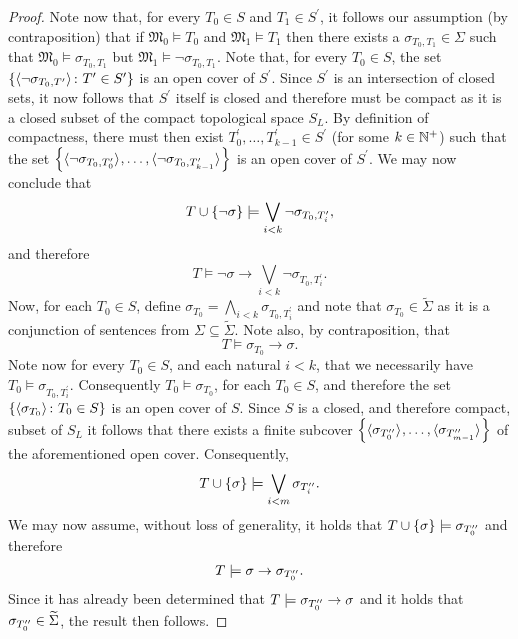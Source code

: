 \begin{proof}
	Note now that, for every $T_0\in S$ and $T_1\in S^\prime$, it follows our assumption (by contraposition) that if $\mathfrak{M}_0\models T_0$ and $\mathfrak{M}_1\models T_1$ then there exists a $\sigma_{T_0,T_1}\in\Sigma$ such that $\mathfrak{M}_0\models\sigma_{T_0,T_1}$ but $\mathfrak{M}_1\models\neg\sigma_{T_0,T_1}$.  Note that, for every $T_0\in S$, the set $\left\lbrace \langle \neg\sigma_{T_0,T^\prime}\rangle_{}\colon {T^\prime\in S^\prime} \right\rbrace$ is an open cover of $S^\prime$.  Since $S^\prime$ is an intersection of closed sets, it now follows that $S^\prime$ itself is closed and therefore must be compact as it is a closed subset of the compact topological space $S_L$.  By definition of compactness, there must then exist $T^\prime_0,\dotsc,T^\prime_{k-1}\in S^\prime$ (for some $k\in\mathbb{N}^{+}$) such that the set $\left\lbrace \langle \neg\sigma_{T_0,T^\prime_0}\rangle_{},\dotsc,\langle \neg\sigma_{T_0,T^\prime_{k-1}}\rangle_{}\right\rbrace$ is an open cover of $S^\prime$.  We may now conclude that
	\begin{equation}
		T\cup\left\lbrace \neg\sigma\right\rbrace\models\bigvee_{i<k}\neg\sigma_{T_0,T^\prime_i},
	\end{equation}
	and therefore
	\begin{equation}
		T\models\neg\sigma\rightarrow\bigvee_{i<k}\neg\sigma_{T_0,T^\prime_i}.\label{eq:tmnsr}
	\end{equation}
	Now, for each $T_0\in S$, define $\sigma_{T_0}=\bigwedge_{i<k}\sigma_{T_0,T^\prime_i}$ and note that $\sigma_{T_0}\in\widetilde{\Sigma}$ as it is a conjunction of sentences from $\Sigma\subseteq\widetilde{\Sigma}$.  Note also, by contraposition, that
	\begin{equation}
		T\models\sigma_{T_0}\rightarrow\sigma.
	\end{equation}
	Note now for every $T_0\in S$, and each natural $i<k$, that we necessarily have $T_0\models\sigma_{T_0,T_i^\prime}$.  Consequently $T_0\models\sigma_{T_0}$, for each $T_0\in S$, and therefore the set $\left\lbrace \langle \sigma_{T_0}\rangle_{}\colon T_0\in S \right\rbrace$ is an open cover of $S$.  Since $S$ is a closed, and therefore compact, subset of $S_L$ it follows that there exists a finite subcover $\left\lbrace \langle \sigma_{T^{\prime\prime}_0}\rangle_{},\dotsc,\langle \sigma_{T^{\prime\prime}_{m-1}}\rangle_{}\right\rbrace$ of the aforementioned open cover.  Consequently,
	\begin{equation}
		T\cup\left\lbrace \sigma\right\rbrace\models\bigvee_{i<m}\sigma_{T^{\prime\prime}_i}.
	\end{equation}
	We may now assume, without loss of generality, it holds that $T\cup\left\lbrace \sigma\right\rbrace\models\sigma_{T^{\prime\prime}_0}$ and therefore
	\begin{equation}
		T\models\sigma\rightarrow\sigma_{T^{\prime\prime}_0}.
	\end{equation}
	Since it has already been determined that $T\models\sigma_{T_0^{\prime\prime}}\rightarrow\sigma$ and it holds that $\sigma_{T^{\prime\prime}_0}\in\widetilde{\Sigma}$, the result then follows.
\end{proof}

